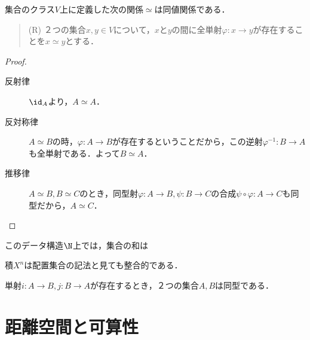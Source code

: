 \documentclass[uplatex,dvipdfmx]{jsreport}
\begin{document}
\begin{lemma}[同型は同値関係である]
    集合のクラス$V$上に定義した次の関係$\simeq$は同値関係である．
    \begin{quote}
        (R) ２つの集合$x,y\in V$について，$x$と$y$の間に全単射$\varphi:x\to y$が存在することを$x\simeq y$とする．
    \end{quote}
\end{lemma}
\begin{proof}
    \begin{description}
        \item[反射律] $\id_A$より，$A\simeq A$．
        \item[反対称律] $A\simeq B$の時，$\varphi:A\to B$が存在するということだから，この逆射$\varphi^{-1}:B\to A$も全単射である．よって$B\simeq A$．
        \item[推移律] $A\simeq B,B\simeq C$のとき，同型射$\varphi:A\to B,\psi:B\to C$の合成$\psi\circ\varphi:A\to C$も同型だから，$A\simeq C$．
    \end{description}
\end{proof}
\begin{remark}
    このデータ構造$\N$上では，集合の和は

    積$X^n$は配置集合の記法と見ても整合的である．
\end{remark}

\begin{theorem}[Bernstein]
    単射$i:A\to B,j:B\to A$が存在するとき，２つの集合$A,B$は同型である．
\end{theorem}


\chapter{距離空間と可算性}
\end{document}

